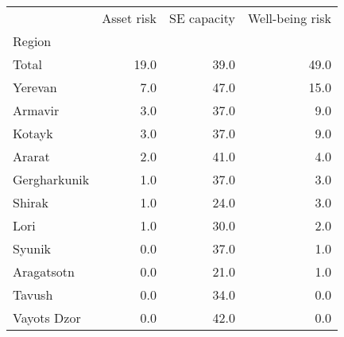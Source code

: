 \begin{tabular}{lrrr}
\toprule
{} &  Asset risk &  SE capacity &  Well-being risk \\
Region       &             &              &                  \\
\midrule
Total        &        19.0 &         39.0 &             49.0 \\
Yerevan      &         7.0 &         47.0 &             15.0 \\
Armavir      &         3.0 &         37.0 &              9.0 \\
Kotayk       &         3.0 &         37.0 &              9.0 \\
Ararat       &         2.0 &         41.0 &              4.0 \\
Gergharkunik &         1.0 &         37.0 &              3.0 \\
Shirak       &         1.0 &         24.0 &              3.0 \\
Lori         &         1.0 &         30.0 &              2.0 \\
Syunik       &         0.0 &         37.0 &              1.0 \\
Aragatsotn   &         0.0 &         21.0 &              1.0 \\
Tavush       &         0.0 &         34.0 &              0.0 \\
Vayots Dzor  &         0.0 &         42.0 &              0.0 \\
\bottomrule
\end{tabular}
